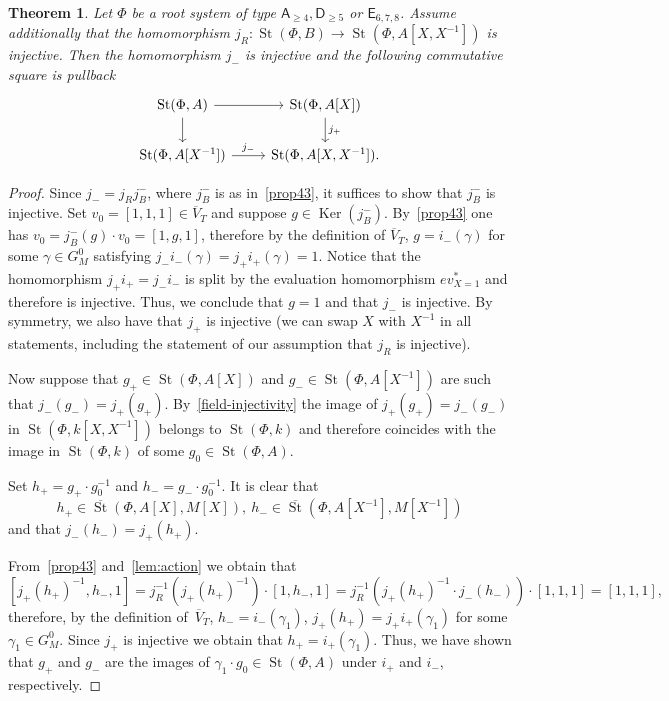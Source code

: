 \documentclass[oneside, 8pt]{amsart}
\newtheorem{theorem}{Theorem}
\theoremstyle{remark}
\theoremstyle{definition}
\numberwithin{lemma}{section}
\numberwithin{prop}{section}
\numberwithin{corollary}{section}
\numberwithin{externaltheorem}{section}
\DeclareMathOperator{\Ker}{Ker}
\DeclareMathOperator{\St}{St}
\newcommand{\inv}{^{-1}}
\newcommand{\rA}{\mathsf{A}}
\newcommand{\rD}{\mathsf{D}}
\newcommand{\rE}{\mathsf{E}}
\numberwithin{equation}{section}
\begin{document}
\begin{theorem} \label{thm:P1glueing}
 Let $\Phi$ be a root system of type $\rA_{\geq 4}, \rD_{\geq 5}$ or $\rE_{6,7,8}$.
 Assume additionally that the homomorphism $j_R \colon \St(\Phi, B) \to \St(\Phi, A[X, X\inv])$ is injective.  
 Then the homomorphism $j_-$ is injective and the following commutative square is pullback
 \[ \begin{tikzcd} \St(\Phi, A) \arrow{r} \arrow{d} & \St(\Phi, A[X]) \arrow{d}{j_+} \\ \St(\Phi, A[X\inv]) \arrow{r}{j_-} & \St(\Phi, A[X, X\inv]). \end{tikzcd} \] 
\end{theorem}
\begin{proof} Since $j_- = j_R j_B^-$, where $j_B^-$ is as in~\cref{prop43}, it suffices to show that $j_B^-$ is injective.
 Set $v_0 = [1, 1, 1] \in \overline{V}_T$ and suppose $g \in \Ker(j_B^-)$.
 By~\cref{prop43} one has $v_0 = j_B^-(g) \cdot v_0 = [1, g, 1]$, therefore by the definition of $\overline{V}_T$, $g = i_-(\gamma)$ for some $\gamma \in G_M^0$ satisfying $j_-i_-(\gamma) = j_+i_+(\gamma) = 1$.
 Notice that the homomorphism $j_+i_+ = j_-i_-$ is split by the evaluation homomorphism $ev_{X=1}^*$ and therefore is injective. Thus, we conclude that $g = 1$ and that $j_-$ is injective. By symmetry, we also have that $j_+$ is injective (we can swap $X$ with $X^{-1}$ in all statements, including the statement of our assumption that $j_R$ is injective).
 
 Now suppose that $g_+ \in \St(\Phi, A[X])$ and $g_- \in \St(\Phi, A[X\inv])$ are such that $j_-(g_-) = j_+(g_+)$.
 By~\cref{field-injectivity} the image of $j_+(g_+) = j_-(g_-)$ in $\St(\Phi, k[X, X\inv])$ belongs to $\St(\Phi, k)$ and therefore coincides with the image in $\St(\Phi, k)$ of some $g_0 \in \St(\Phi, A)$.
 
 Set $h_+ = g_+\cdot g_0^{-1}$ and $h_- = g_- \cdot g_0^{-1}$.
 It is clear that \[ h_+ \in \overline{\St}(\Phi, A[X], M[X]),\ h_- \in \overline{\St}(\Phi, A[X\inv], M[X\inv])\]
 and that $j_-(h_-) = j_+(h_+).$
 
 From~\cref{prop43} and~\cref{lem:action} we obtain that
 \begin{equation} \nonumber [j_+(h_+)^{-1}, h_-, 1] = j_R^{-1}(j_+(h_+)^{-1}) \cdot [1, h_-, 1] = j_R^{-1}(j_+(h_+)^{-1} \cdot j_-(h_-)) \cdot [1, 1, 1] = [1, 1, 1], \end{equation} therefore, by the definition of~$\overline{V}_T$, $h_- = i_-(\gamma_1)$, $j_+(h_+) = j_+i_+(\gamma_1)$ for some $\gamma_1 \in G_M^0$. Since $j_+$ is injective we obtain that $h_+ = i_+(\gamma_1)$. Thus, we have shown that $g_+$ and $g_-$ are the images of $\gamma_1 \cdot g_0 \in \St(\Phi, A)$ under $i_+$ and $i_-$, respectively.
 \end{proof}
  
\end{document}
